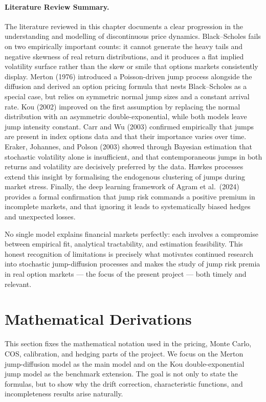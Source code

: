 \documentclass[12pt]{article}
\begin{document}
\paragraph{Literature Review Summary.}
The literature reviewed in this chapter documents a clear progression in the understanding and modelling of discontinuous price dynamics. Black--Scholes fails on two empirically important counts: it cannot generate the heavy tails and negative skewness of real return distributions, and it produces a flat implied volatility surface rather than the skew or smile that options markets consistently display. Merton (1976) introduced a Poisson-driven jump process alongside the diffusion and derived an option pricing formula that nests Black--Scholes as a special case, but relies on symmetric normal jump sizes and a constant arrival rate. Kou (2002) improved on the first assumption by replacing the normal distribution with an asymmetric double-exponential, while both models leave jump intensity constant. Carr and Wu (2003) confirmed empirically that jumps are present in index options data and that their importance varies over time. Eraker, Johannes, and Polson (2003) showed through Bayesian estimation that stochastic volatility alone is insufficient, and that contemporaneous jumps in both returns and volatility are decisively preferred by the data. Hawkes processes extend this insight by formalising the endogenous clustering of jumps during market stress. Finally, the deep learning framework of Agram et al.\ (2024) provides a formal confirmation that jump risk commands a positive premium in incomplete markets, and that ignoring it leads to systematically biased hedges and unexpected losses.

No single model explains financial markets perfectly: each involves a compromise between empirical fit, analytical tractability, and estimation feasibility. This honest recognition of limitations is precisely what motivates continued research into stochastic jump-diffusion processes and makes the study of jump risk premia in real option markets --- the focus of the present project --- both timely and relevant.

\newpage
\section*{Mathematical Derivations}
\label{sec:mathematical_derivations}

This section fixes the mathematical notation used in the pricing, Monte Carlo, COS, calibration, and hedging parts of the project. We focus on the Merton jump-diffusion model as the main model and on the Kou double-exponential jump model as the benchmark extension. The goal is not only to state the formulas, but to show why the drift correction, characteristic functions, and incompleteness results arise naturally.
\end{document}
